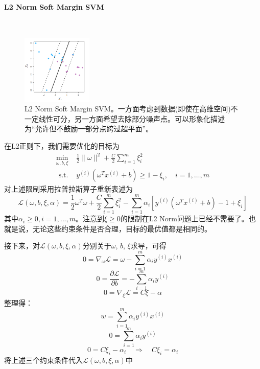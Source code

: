 \documentclass[UTF8, fleqn,10pt]{SelfArx} %
\begin{document}
	\paragraph{L2 Norm Soft Margin SVM}\ 
	\begin{figure}[H]
		\centering
		\includegraphics[width=0.3\textwidth]{figure/softsvm}
		\caption{L2 Norm Soft Margin SVM。一方面考虑到数据(即使在高维空间)不一定线性可分，另一方面希望去除部分噪声点。可以形象化描述为“允许但不鼓励一部分点跨过超平面”。}
	\end{figure}
	\noindent
	在L2正则下，我们需要优化的目标为
	\begin{equation*}
	\begin{aligned} \min _{\omega, b, \xi} & \frac{1}{2}\|\omega\|^{2}+\frac{C}{2} \sum_{i=1}^{m} \xi_{i}^{2} \\ \text { s.t. } & y^{(i)}\left(\omega^{T} x^{(i)}+b\right) \geq 1-\xi_{i}, \quad i=1, \ldots, m \end{aligned}
	\end{equation*}
	对上述限制采用拉普拉斯算子重新表述为
	$$
	\mathcal{L}(\omega, b, \xi, \alpha)=\frac{1}{2} \omega^{T} \omega+\frac{C}{2} \sum_{i=1}^{m} \xi_{i}^{2}-\sum_{i=1}^{m} \alpha_{i}\left[y^{(i)}\left(\omega^{T} x^{(i)}+b\right)-1+\xi_{i}\right]
	$$
	其中$\alpha_{i} \geq 0 , i = 1,...,m$。注意到$\xi \geq 0$的限制在L2 Norm问题上已经不需要了。也就是说，无论这些约束条件是否合理，目标的最优值都是相同的。\par
	接下来，对$\mathcal{L}(\omega, b, \xi, \alpha)$分别关于$\omega$, $b$,  $\xi$求导，可得
	$$0=\nabla_{\omega} \mathcal{L}=\omega-\sum_{i=1}^{m} \alpha_{i} y^{(i)} x^{(i)}$$
	$$
	0=\frac{\partial \mathcal{L}}{\partial b}=-\sum_{i=1}^{m} \alpha_{i} y^{(i)}
	$$
	$$
	0=\nabla_{\xi} \mathcal{L}=C \xi-\alpha
	$$
	整理得：
	$$w=\sum_{i=1}^{m} \alpha_{i} y^{(i)} x^{(i)}$$
	$$
	0=\sum_{i=1}^{m} \alpha_{i} y^{(i)}
	$$
	$$
	0=C \xi_{i}-\alpha_{i} \quad \Rightarrow \quad C \xi_{i}=\alpha_{i}
	$$
	将上述三个约束条件代入$\mathcal{L}(\omega, b, \xi, \alpha)$中
\end{document}
